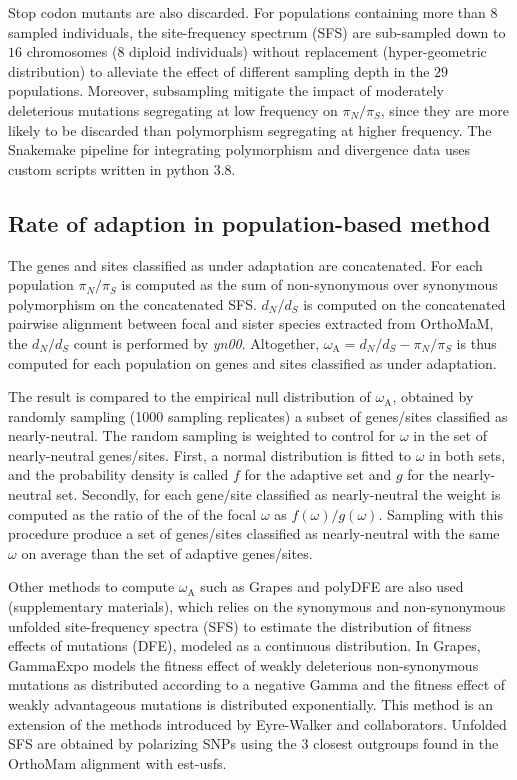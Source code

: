 \documentclass{article}
\newcommand{\dn}{d_N}
\newcommand{\ds}{d_S}
\newcommand{\dnds}{\dn / \ds}
\newcommand{\pn}{\pi_N}
\newcommand{\ps}{\pi_S}
\newcommand{\pnps}{\pn / \ps}
\begin{document}
Stop codon mutants are also discarded.
For populations containing more than $8$ sampled individuals, the site-frequency spectrum (SFS) are sub-sampled down to $16$ chromosomes ($8$ diploid individuals) without replacement (hyper-geometric distribution) to alleviate the effect of different sampling depth in the $29$ populations.
Moreover, subsampling mitigate the impact of moderately deleterious mutations segregating at low frequency on $\pnps$, since they are more likely to be discarded than polymorphism segregating at higher frequency.
The Snakemake pipeline for integrating polymorphism and divergence data uses custom scripts written in python 3.8.

\subsection*{Rate of adaption in population-based method}

The genes and sites classified as under adaptation are concatenated.
For each population $\pnps$ is computed as the sum of non-synonymous over synonymous polymorphism on the concatenated SFS.
$\dnds$ is computed on the concatenated pairwise alignment between focal and sister species extracted from OrthoMaM, the $\dnds$ count is performed by \textit{yn00}.
Altogether, $\omega_{\mathrm{A}} = \dnds - \pnps$ is thus computed for each population on genes and sites classified as under adaptation.

The result is compared to the empirical null distribution of $\omega_{\mathrm{A}}$, obtained by randomly sampling (1000 sampling replicates) a subset of genes/sites classified as nearly-neutral.
The random sampling is weighted to control for $\omega$ in the set of nearly-neutral genes/sites.
First, a normal distribution is fitted to $\omega$ in both sets, and the probability density is called $f$ for the adaptive set and $g$ for the nearly-neutral set.
Secondly, for each gene/site classified as nearly-neutral the weight is computed as the ratio of the of the focal $\omega$ as $f(\omega)/g(\omega)$.
Sampling with this procedure produce a set of genes/sites classified as nearly-neutral with the same $\omega$ on average than the set of adaptive genes/sites.

Other methods to compute $\omega_{\mathrm{A}}$ such as Grapes\cite{galtier_adaptive_2016} and polyDFE\cite{tataru_polydfe_2020} are also used (supplementary materials), which relies on the synonymous and non-synonymous unfolded site-frequency spectra (SFS) to estimate the distribution of fitness effects of mutations (DFE), modeled as a continuous distribution.
In Grapes, GammaExpo models the fitness effect of weakly deleterious non-synonymous mutations as distributed according to a negative Gamma and the fitness effect of weakly advantageous mutations is distributed exponentially.
This method is an extension of the methods introduced by Eyre-Walker and collaborators\cite{eyre-walker_distribution_2006, eyre-walker_estimating_2009}.
Unfolded SFS are obtained by polarizing SNPs using the $3$ closest outgroups found in the OrthoMam alignment with est-usfs\cite{keightley_inferring_2018}.
\end{document}
